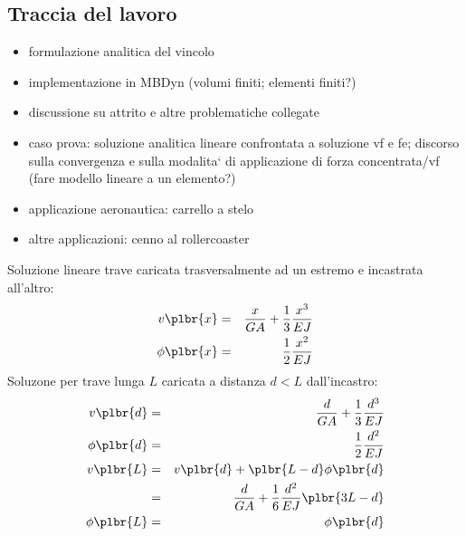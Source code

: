 \documentclass[12pt,dvips,fleqn,italian]{article}
\begin{document}




\subsection*{Traccia del lavoro}

\begin{itemize}
\item formulazione analitica del vincolo
\item implementazione in MBDyn (volumi finiti; elementi finiti?)
\item discussione su attrito e altre problematiche collegate
\item caso prova: soluzione analitica lineare confrontata a soluzione vf e fe;
  discorso sulla convergenza e sulla modalita` di applicazione
  di forza concentrata/vf (fare modello lineare a un elemento?)
\item applicazione aeronautica: carrello a stelo
\item altre applicazioni: cenno al rollercoaster
\end{itemize}

\noindent
Soluzione lineare trave caricata trasversalmente ad un estremo e incastrata
all'altro:
\begin{eqnarray*}
	v\plbr{x} & = & \frac{x}{GA}+\frac{1}{3}\frac{x^3}{EJ} \\
	\phi\plbr{x} & = & \frac{1}{2}\frac{x^2}{EJ}
\end{eqnarray*}
Soluzone per trave lunga $L$ caricata a distanza $d<L$ dall'incastro:
\begin{eqnarray*}
	v\plbr{d} & = & \frac{d}{GA}+\frac{1}{3}\frac{d^3}{EJ} \\
	\phi\plbr{d} & = & \frac{1}{2}\frac{d^2}{EJ} \\
	v\plbr{L} & = & v\plbr{d} + \plbr{L-d}\phi\plbr{d} \\
	& = & \frac{d}{GA}+\frac{1}{6}\frac{d^2}{EJ}\plbr{3L - d} \\
	\phi\plbr{L} & = & \phi\plbr{d}
\end{eqnarray*}
\end{document}
